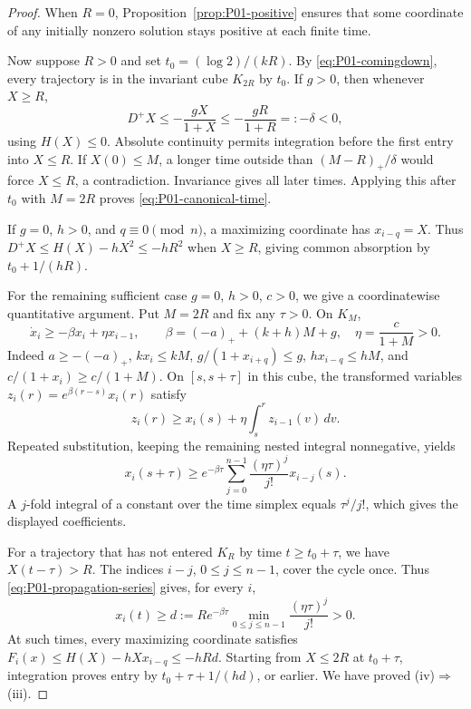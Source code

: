 \documentclass[11pt]{article}
\theoremstyle{definition}
\theoremstyle{remark}
\begin{document}
\begin{proof}
When $R=0$, Proposition~\ref{prop:P01-positive} ensures that some
coordinate of any initially nonzero solution stays positive at each
finite time.

Now suppose $R>0$ and set $t_0=(\log2)/(kR)$. By
\eqref{eq:P01-comingdown}, every trajectory is in the invariant cube
$K_{2R}$ by $t_0$. If $g>0$, then whenever $X\ge R$,
\begin{equation}
\label{eq:P01-strict-gap}
 D^+X\le-\frac{gX}{1+X}\le-\frac{gR}{1+R}=:-\delta<0,
\end{equation}
using $H(X)\le0$. Absolute continuity permits integration before
the first entry into $X\le R$. If $X(0)\le M$, a longer time outside
than $(M-R)_+/\delta$ would force $X\le R$, a contradiction.
Invariance gives all later times. Applying this after $t_0$ with
$M=2R$ proves \eqref{eq:P01-canonical-time}.

If $g=0$, $h>0$, and $q\equiv0\pmod n$, a maximizing coordinate
has $x_{i-q}=X$. Thus $D^+X\le H(X)-hX^2\le-hR^2$ when $X\ge R$,
giving common absorption by $t_0+1/(hR)$.

For the remaining sufficient case $g=0$, $h>0$, $c>0$, we give a
coordinatewise quantitative argument. Put $M=2R$ and fix any
$\tau>0$. On $K_M$,
\begin{equation}
\label{eq:P01-propagation-bound}
 \dot x_i\ge-\beta x_i+\eta x_{i-1},\qquad
 \beta=(-a)_++(k+h)M+g,\quad \eta=\frac{c}{1+M}>0.
\end{equation}
Indeed $a\ge-(-a)_+$, $kx_i\le kM$,
$g/(1+x_{i+q})\le g$, $h x_{i-q}\le hM$, and
$c/(1+x_i)\ge c/(1+M)$. On $[s,s+\tau]$ in this cube, the transformed
variables $z_i(r)=e^{\beta(r-s)}x_i(r)$ satisfy
\[
 z_i(r)\ge x_i(s)+\eta\int_s^r z_{i-1}(v)\,dv.
\]
Repeated substitution, keeping the remaining nested integral
nonnegative, yields
\begin{equation}
\label{eq:P01-propagation-series}
 x_i(s+\tau)\ge e^{-\beta\tau}
       \sum_{j=0}^{n-1}\frac{(\eta\tau)^j}{j!}x_{i-j}(s).
\end{equation}
A $j$-fold integral of a constant over the time simplex equals
$\tau^j/j!$, which gives the displayed coefficients.

For a trajectory that has not entered $K_R$ by time $t\ge t_0+\tau$,
we have $X(t-\tau)>R$. The indices $i-j$, $0\le j\le n-1$, cover
the cycle once. Thus \eqref{eq:P01-propagation-series} gives, for every $i$,
\begin{equation}
\label{eq:P01-positive-floor}
 x_i(t)\ge d:=R e^{-\beta\tau}
        \min_{0\le j\le n-1}\frac{(\eta\tau)^j}{j!}>0.
\end{equation}
At such times, every maximizing coordinate satisfies
$F_i(x)\le H(X)-hXx_{i-q}\le-hRd$.
Starting from $X\le2R$ at $t_0+\tau$, integration proves entry by
$t_0+\tau+1/(hd)$, or earlier. We have proved (iv)$\Rightarrow$(iii).


\end{proof}
\end{document}
